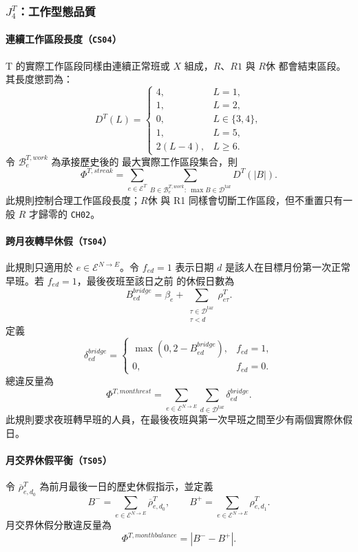 \documentclass[a4paper,12pt]{article}
\begin{document}
\subsubsection{\texorpdfstring{$J^T_4$}{J4}：工作型態品質}

\paragraph{連續工作區段長度（\texttt{CS04}）}
T 的實際工作區段同樣由連續正常班或 \(X\) 組成，\(R\)、\(R1\) 與 \(R休\)
都會結束區段。其長度懲罰為：
\[
  D^T(L)=
  \begin{cases}
    4, & L=1,\\
    1, & L=2,\\
    0, & L\in\{3,4\},\\
    1, & L=5,\\
    2(L-4), & L\geq6.
  \end{cases}
\]
令 \(\mathcal{B}^{T,work}_e\) 為承接歷史後的
最大實際工作區段集合，則
\[
  \Phi^{T,streak}
  =
  \sum_{e\in\mathcal{E}^{T}}
  \sum_{B\in\mathcal{B}^{T,work}_e:\ \max B\in\mathcal{D}^{\mathrm{tar}}}
  D^T(|B|).
\]
此規則控制合理工作區段長度；\(R休\) 與 R1 同樣會切斷工作區段，但不重置只有一般 \(R\) 才歸零的 \texttt{CH02}。

\paragraph{跨月夜轉早休假（\texttt{TS04}）}
此規則只適用於 \(e\in\mathcal{E}^{N\rightarrow E}\)。令 \(f_{ed}=1\) 表示日期
\(d\) 是該人在目標月份第一次正常早班。若 \(f_{ed}=1\)，最後夜班至該日之前
的休假日數為
\[
  B^{bridge}_{ed}
  =
  \beta_e
  +
  \sum_{\substack{\tau\in\mathcal{D}^{\mathrm{tar}}\\\tau<d}}
  \rho^{T}_{e\tau}.
\]
定義
\[
  \delta^{bridge}_{ed}
  =
  \begin{cases}
    \max(0,2-B^{bridge}_{ed}), & f_{ed}=1,\\
    0, & f_{ed}=0.
  \end{cases}
\]
總違反量為
\[
  \Phi^{T,monthrest}
  =
  \sum_{e\in\mathcal{E}^{N\rightarrow E}}
  \sum_{d\in\mathcal{D}^{\mathrm{tar}}}\delta^{bridge}_{ed}.
\]
此規則要求夜班轉早班的人員，在最後夜班與第一次早班之間至少有兩個實際休假日。

\paragraph{月交界休假平衡（\texttt{TS05}）}
令 \(\overline{\rho}^{T}_{e,d_0}\) 為前月最後一日的歷史休假指示，並定義
\[
  B^{-}
  =
  \sum_{e\in\mathcal{E}^{N\rightarrow E}}
  \overline{\rho}^{T}_{e,d_0},
  \qquad
  B^{+}
  =
  \sum_{e\in\mathcal{E}^{N\rightarrow E}}
  \rho^{T}_{e,d_1}.
\]
月交界休假分散違反量為
\[
  \Phi^{T,monthbalance}=|B^{-}-B^{+}|.
\]
\end{document}

